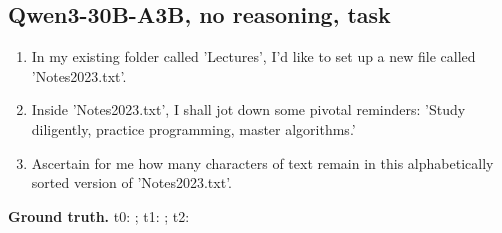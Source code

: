 \subsection*{Qwen3-30B-A3B, no reasoning, task }
\begin{enumerate}[label=Turn~\arabic*:,leftmargin=*,itemsep=0pt,start=0]\small
  \item In my existing folder called 'Lectures', I'd like to set up a new file called 'Notes2023.txt'.
  \item Inside 'Notes2023.txt', I shall jot down some pivotal reminders: 'Study diligently, practice programming, master algorithms.'
  \item Ascertain for me how many characters of text remain in this alphabetically sorted version of 'Notes2023.txt'.
\end{enumerate}
{\sloppy\noindent\small\textbf{Ground truth.} t0: ; t1: ; t2: \par}\medskip

